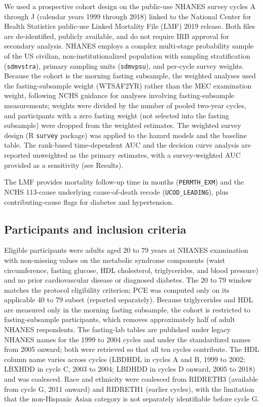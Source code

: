 \documentclass[11pt]{article}
\begin{document}
We used a prospective cohort design on the public-use NHANES survey \citep{nhaneslmf2019} cycles A through J (calendar years 1999 through 2018) linked to the National Center for Health Statistics public-use Linked Mortality File (LMF) 2019 release. Both files are de-identified, publicly available, and do not require IRB approval for secondary analysis. NHANES employs a complex multi-stage probability sample of the US civilian, non-institutionalized population with sampling stratification (\texttt{sdmvstra}), primary sampling units (\texttt{sdmvpsu}), and per-cycle survey weights. Because the cohort is the morning fasting subsample, the weighted analyses used the fasting-subsample weight (WTSAF2YR) rather than the MEC examination weight, following NCHS guidance for analyses involving fasting-subsample measurements; weights were divided by the number of pooled two-year cycles, and participants with a zero fasting weight (not selected into the fasting subsample) were dropped from the weighted estimates. The weighted survey design (R \texttt{survey} package) was applied to the hazard models and the baseline table. The rank-based time-dependent AUC and the decision curve analysis are reported unweighted as the primary estimates, with a survey-weighted AUC provided as a sensitivity (see Results).

The LMF provides mortality follow-up time in months (\texttt{PERMTH\_EXM}) and the NCHS 113-cause underlying cause-of-death recode (\texttt{UCOD\_LEADING}), plus contributing-cause flags for diabetes and hypertension.

\subsection*{Participants and inclusion criteria}

Eligible participants were adults aged 20 to 79 years at NHANES examination with non-missing values on the metabolic syndrome components (waist circumference, fasting glucose, HDL cholesterol, triglycerides, and blood pressure) and no prior cardiovascular disease or diagnosed diabetes. The 20 to 79 window matches the protocol eligibility criterion; PCE was computed only on its applicable 40 to 79 subset (reported separately). Because triglycerides and HDL are measured only in the morning fasting subsample, the cohort is restricted to fasting-subsample participants, which removes approximately half of adult NHANES respondents. The fasting-lab tables are published under legacy NHANES names for the 1999 to 2004 cycles and under the standardized names from 2005 onward; both were retrieved so that all ten cycles contribute. The HDL column name varies across cycles (LBDHDL in cycles A and B, 1999 to 2002; LBXHDD in cycle C, 2003 to 2004; LBDHDD in cycles D onward, 2005 to 2018) and was coalesced. Race and ethnicity were coalesced from RIDRETH3 (available from cycle G, 2011 onward) and RIDRETH1 (earlier cycles), with the limitation that the non-Hispanic Asian category is not separately identifiable before cycle G.
\end{document}
